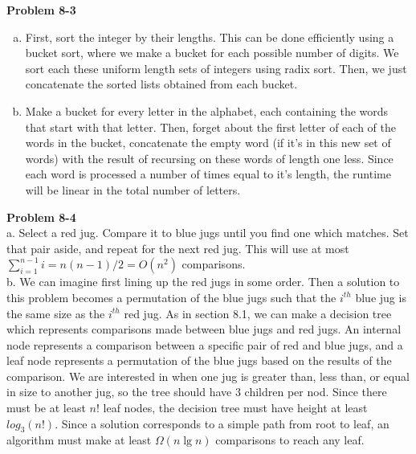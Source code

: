 \documentclass{article}
\begin{document}
\noindent\textbf{Problem 8-3}\\
\begin{enumerate}[a.]
\item
First, sort the integer by their lengths. This can be done efficiently using a bucket sort, where we make a bucket for each possible number of digits. We sort each these uniform length sets of integers using radix sort. Then, we just concatenate the sorted lists obtained from each bucket.

\item
Make a bucket for every letter in the alphabet, each containing the words that start with that letter. Then, forget about the first letter of each of the words in the bucket, concatenate the empty word (if it's in this new set of words) with the result of recursing on these words of length one less. Since each word is processed a number of times equal to it's length, the runtime will be linear in the total number of letters.

\end{enumerate}

\noindent\textbf{Problem 8-4}\\

a. Select a red jug.  Compare it to blue jugs until you find one which matches.  Set that pair aside, and repeat for the next red jug.  This will use at most $\sum_{i=1}^{n-1} i = n(n-1)/2 = O(n^2)$ comparisons. \\

b. We can imagine first lining up the red jugs in some order.  Then a solution to this problem becomes a permutation of the blue jugs such that the $i^{th}$ blue jug is the same size as the $i^{th}$ red jug. As in section 8.1, we can make a decision tree which represents comparisons made between blue jugs and red jugs.  An internal node represents a comparison between a specific pair of red and blue jugs, and a leaf node represents a permutation of the blue jugs based on the results of the comparison. We are interested in when one jug is greater than, less than, or equal in size to another jug, so the tree should have 3 children per nod.  Since there must be at least $n!$ leaf nodes, the decision tree must have height at least $log_3(n!)$.  Since a solution corresponds to a simple path from root to leaf, an algorithm must make at least $\Omega(n \lg n)$ comparisons to reach any leaf. \\
\end{document}
